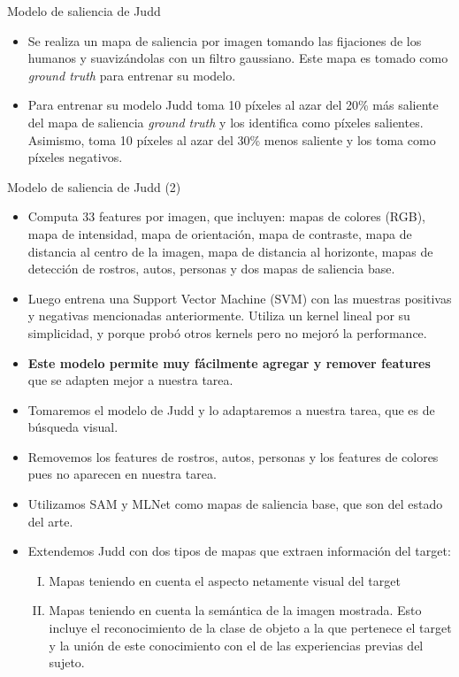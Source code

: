 \documentclass[compress]{beamer}
\begin{document}
\begin{frame}{Modelo de saliencia de Judd}
\begin{itemize}
\item Se realiza un mapa de saliencia por imagen tomando las fijaciones de los humanos y suavizándolas con un filtro gaussiano. Este mapa es tomado como \textit{ground truth} para entrenar su modelo.
\item Para entrenar su modelo Judd toma 10 píxeles al azar del 20\% más saliente del mapa de saliencia  \textit{ground truth} y los identifica como píxeles salientes. Asimismo, toma 10 píxeles al azar del 30\% menos saliente y los toma como píxeles negativos.
\end{itemize}
\end{frame}

\begin{frame}{Modelo de saliencia de Judd (2)}
\begin{itemize}
\item Computa 33 features por imagen, que incluyen: mapas de colores (RGB), mapa de intensidad, mapa de orientación, mapa de contraste, mapa de distancia al centro de la imagen, mapa de distancia al horizonte, mapas de detección de rostros, autos, personas y dos mapas de saliencia base.
\item Luego entrena una Support Vector Machine (SVM) con las muestras positivas y negativas mencionadas anteriormente. Utiliza un kernel lineal por su simplicidad, y porque probó otros kernels pero no mejoró la performance.
\item \textbf{Este modelo permite muy fácilmente agregar y remover features} que se adapten mejor a nuestra tarea.
\end{itemize}
\end{frame}

\begin{frame}
\begin{itemize}
\item Tomaremos el modelo de Judd y lo adaptaremos a nuestra tarea, que es de búsqueda visual.
\item Removemos los features de rostros, autos, personas y los features de colores pues no aparecen en nuestra tarea.
\item Utilizamos SAM y MLNet como mapas de saliencia base, que son del estado del arte.
\bigskip
\item Extendemos Judd con dos tipos de mapas que extraen información del target:
\begin{enumerate}[I.]
\item Mapas teniendo en cuenta el aspecto netamente visual del target
\item Mapas teniendo en cuenta la semántica de la imagen mostrada. Esto incluye el reconocimiento de la clase de objeto a la que pertenece el target y la unión de este conocimiento con el de las experiencias previas del sujeto.
\end{enumerate}
\end{itemize}
\end{frame}
\end{document}
